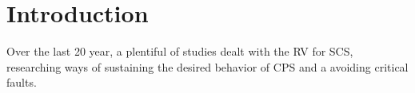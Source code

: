 \chapter{Introduction}

Over the last 20 year, a plentiful of studies dealt with the \gls{RV} for \gls{SCS}, researching ways of sustaining the desired behavior of \gls{CPS} and a avoiding critical faults.









